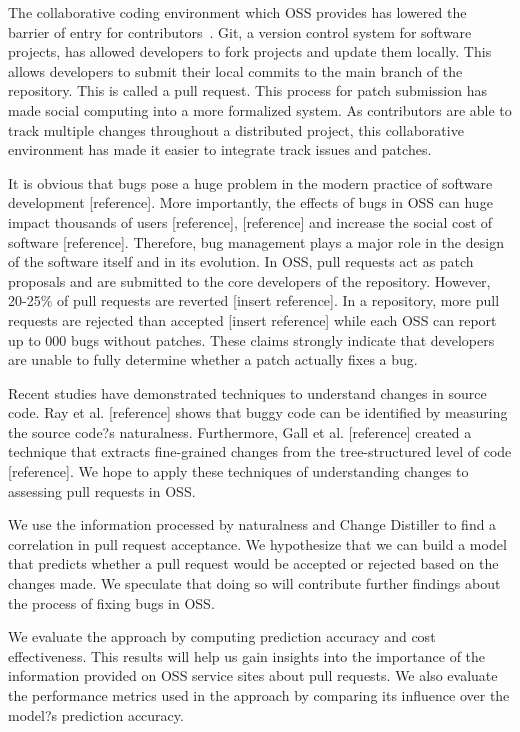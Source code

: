 \documentclass[10pt, conference]{IEEEtran}
\begin{document}
The collaborative coding environment which OSS provides has lowered the barrier of entry for contributors~\cite{Yu}. Git, a version control system for software projects, has allowed developers to fork projects and update them locally. This allows developers to submit their local commits to the main branch of the repository. This is called a pull request. This process for patch submission has made social computing into a more formalized system. As contributors are able to track multiple changes throughout a distributed project, this collaborative environment has made it easier to integrate track issues and patches.

It is obvious that bugs pose a huge problem in the modern practice of software development  [reference]. More importantly, the effects of bugs in OSS can huge impact thousands of users [reference], [reference] and increase the social cost of software [reference]. Therefore, bug management plays a major role in the design of the software itself and in its evolution. In OSS, pull requests act as patch proposals and are submitted to the core developers of the repository. However, 20-25\% of pull requests are reverted [insert reference]. In a repository, more pull requests are rejected than accepted [insert reference] while each OSS can report up to 000 bugs without patches. These claims strongly indicate that developers are unable to fully determine whether a patch actually fixes a bug.

Recent studies have demonstrated techniques to understand changes in source code. Ray et al. [reference] shows that buggy code can be identified by measuring the source code?s naturalness. Furthermore, Gall et al. [reference] created a technique that extracts fine-grained changes from the tree-structured level of code [reference]. We hope to apply these techniques of understanding changes to assessing pull requests in OSS.

We use the information processed by naturalness and Change Distiller to find a correlation in pull request acceptance. We hypothesize that we can build a model that predicts whether a pull request would be accepted or rejected based on the changes made. We speculate that doing so will contribute further findings about the process of fixing bugs in OSS.

We evaluate the approach by computing prediction accuracy and cost effectiveness. This results will help us gain insights into the importance of the information provided on OSS service sites about pull requests. We also evaluate the performance metrics used in the approach by comparing its influence over the model?s prediction accuracy. 
\end{document}
